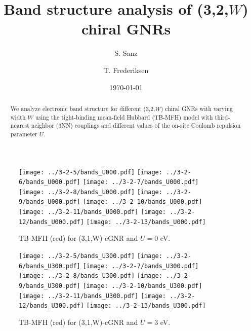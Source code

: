 \documentclass[twocolumn,amsmath,%
amssymb,prb,superscriptaddress]{revtex4}
\begin{document}
\title{Band structure analysis of (3,2,$W$) chiral GNRs}

\author{S. Sanz}

\author{T. Frederiksen}

\date{\today}

\begin{abstract}
We analyze electronic band structure for different (3,2,$W$) chiral GNRs with varying width 
$W$ using the tight-binding mean-field Hubbard (TB-MFH) model 
with third-nearest neighbor (3NN) couplings and
different values of the on-site Coulomb repulsion parameter $U$.
\end{abstract}

\maketitle

\begin{figure*}
	\texttt{[image: ../3-2-5/bands\_U000.pdf]}
	\texttt{[image: ../3-2-6/bands\_U000.pdf]}
	\texttt{[image: ../3-2-7/bands\_U000.pdf]}\\
	\texttt{[image: ../3-2-8/bands\_U000.pdf]}
	\texttt{[image: ../3-2-9/bands\_U000.pdf]}
	\texttt{[image: ../3-2-10/bands\_U000.pdf]}\\
	\texttt{[image: ../3-2-11/bands\_U000.pdf]}
	\texttt{[image: ../3-2-12/bands\_U000.pdf]}
	\texttt{[image: ../3-2-13/bands\_U000.pdf]}
	\caption{TB-MFH (red) for (3,1,W)-cGNR and $U=0$ eV.} 
\end{figure*}

\begin{figure*}
	\texttt{[image: ../3-2-5/bands\_U300.pdf]}
	\texttt{[image: ../3-2-6/bands\_U300.pdf]}
	\texttt{[image: ../3-2-7/bands\_U300.pdf]}\\
	\texttt{[image: ../3-2-8/bands\_U300.pdf]}
	\texttt{[image: ../3-2-9/bands\_U300.pdf]}
	\texttt{[image: ../3-2-10/bands\_U300.pdf]}\\
	\texttt{[image: ../3-2-11/bands\_U300.pdf]}
	\texttt{[image: ../3-2-12/bands\_U300.pdf]}
	\texttt{[image: ../3-2-13/bands\_U300.pdf]}
	\caption{TB-MFH (red) for (3,1,W)-cGNR and $U=3$ eV.} 
\end{figure*}
\end{document}
